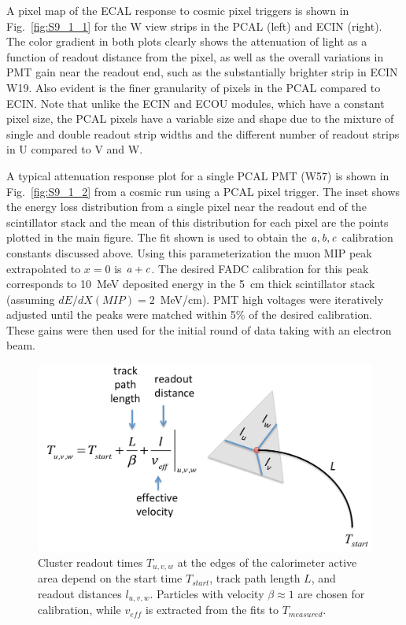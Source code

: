 A pixel map of the ECAL response to cosmic pixel triggers is shown in Fig.~\ref{fig:S9_1_1} for the W view strips in
the PCAL (left) and ECIN (right). The color gradient in both plots clearly shows the attenuation of light as a function
of readout distance from the pixel, as well as the overall variations in PMT gain near the readout end, such as the
substantially brighter strip in ECIN W19. Also evident is the finer granularity of pixels in the PCAL compared to
ECIN. Note that unlike the ECIN and ECOU modules, which have a constant pixel size, the PCAL pixels have
a variable size and shape due to the mixture of single and double readout strip widths and the different number of
readout strips in U compared to V and W. 

A typical attenuation response plot for a single PCAL PMT (W57) is shown in Fig.~\ref{fig:S9_1_2} from a cosmic
run using a PCAL pixel trigger. The inset shows the energy loss distribution from a single pixel near the readout
end of the scintillator stack and the mean of this distribution for each pixel are the points plotted in the main figure.
The fit shown is used to obtain the ${\it a,b,c}$ calibration constants discussed above. Using this parameterization
the muon MIP peak extrapolated to $x=0$ is ${\it a+c}$. The desired FADC calibration for this peak corresponds
to 10~MeV deposited energy in the 5~cm thick scintillator stack (assuming $dE/dX(MIP)=2$~MeV/cm). PMT high
voltages were iteratively adjusted until the peaks were matched within 5\% of the desired calibration. These gains
were then used for the initial round of data taking with an electron beam.

\begin{figure}[hbt]
\centering
\includegraphics[width=1.0\columnwidth,keepaspectratio]{img/S9_2_0.png}
\caption[]{Cluster readout times $T_{u,v,w}$ at the edges of the calorimeter active area depend on the start time
  $T_{start}$, track path length $L$, and readout distances $l_{u,v,w}$. Particles with velocity $\beta\approx 1$ are
  chosen for calibration, while $v_{eff}$ is extracted from the fits to $T_{measured}$.}
\label{fig:S9_2_0}
\end{figure}

